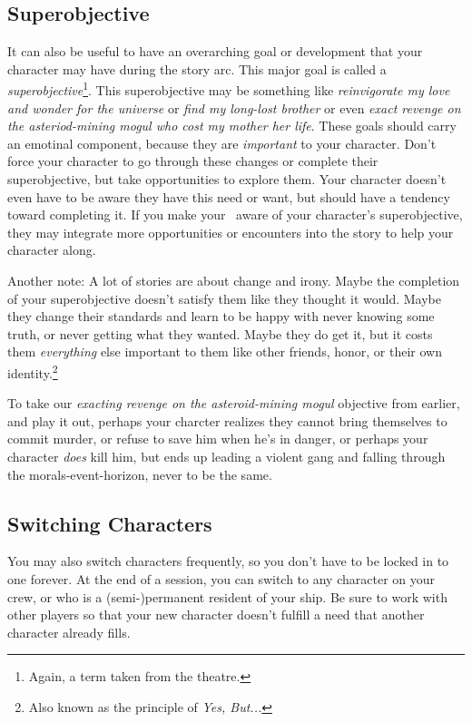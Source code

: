 \subsection{Superobjective}
It can also be useful to have an overarching goal or development that your character may have during the story arc. This major goal is called a \textit{superobjective}\footnote{Again, a term taken from the theatre.}. This superobjective may be something like \textit{reinvigorate my love and wonder for the universe} or \textit{find my long-lost brother} or even \textit{exact revenge on the asteriod-mining mogul who cost my mother her life}. These goals should carry an emotinal component, because they are \textit{important} to your character. Don't force your character to go through these changes or complete their superobjective, but take opportunities to explore them. Your character doesn't even have to be aware they have this need or want, but should have a tendency toward completing it. If you make your \gmLong\, aware of your character's superobjective, they may integrate more opportunities or encounters into the story to help your character along.

\par
Another note: A lot of stories are about change and irony. Maybe the completion of your superobjective doesn't satisfy them like they thought it would. Maybe they change their standards and learn to be happy with never knowing some truth, or never getting what they wanted. Maybe they do get it, but it costs them \textit{everything} else important to them like other friends, honor, or their own identity.\footnote{Also known as the principle of \textit{Yes, But...}}

\par
To take our \textit{exacting revenge on the asteroid-mining mogul} objective from earlier, and play it out, perhaps your charcter realizes they cannot bring themselves to commit murder, or refuse to save him when he's in danger, or perhaps your character \textit{does} kill him, but ends up leading a violent gang and falling through the morals-event-horizon, never to be the same.

\subsection{Switching Characters}

\par
You may also switch characters frequently, so you don't have to be locked in to one forever. At the end of a session, you can switch to any character on your crew, or who is a (semi-)permanent resident of your ship. Be sure to work with other players so that your new character doesn't fulfill a need that another character already fills.

